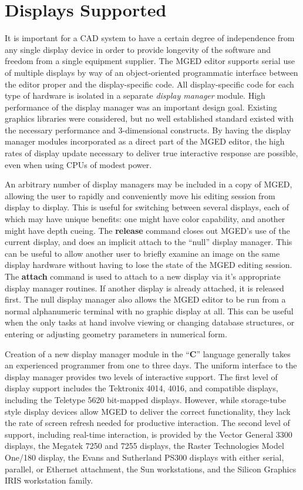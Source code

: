 \section{Displays Supported}

It is important for a CAD system to have a certain degree of independence
from any single display device in order to provide longevity of the
software and freedom from a single equipment supplier.
The MGED editor supports serial use of multiple displays by way of
an object-oriented programmatic
interface between the editor proper and the display-specific code.
All display-specific code for each type of hardware is isolated
in a separate {\em display manager} module.
High performance of the display manager was an important design goal.
Existing graphics libraries
were considered, but no well established standard existed with the necessary
performance and 3-dimensional constructs.
By having the display manager modules incorporated as a direct part of
the MGED editor, the high rates of display update necessary to deliver
true interactive response are possible, even when using CPUs of modest power.

An arbitrary number of
display managers may be included in a copy of MGED, allowing the user
to rapidly and conveniently move his editing session from display to display.
This is useful for switching between several displays, each of
which may have unique benefits:  one might have color capability,
and another might have depth cueing.
The {\bf release} command closes out MGED's use of the current
display, and does an implicit attach to the ``null'' display manager.
This can be useful to allow another user to briefly examine an image
on the same display hardware without having to lose the state of
the MGED editing session.  The {\bf attach} command is used to
attach to a new display via it's appropriate display manager routines.
If another display is already attached, it is released first.
The null display manager also allows the MGED editor to be run from a normal
alphanumeric terminal with no graphic display at all.  This can be useful
when the only tasks at hand involve viewing or changing
database structures, or entering or adjusting geometry parameters
in numerical form.

Creation of a new display manager module in the ``{\bf C}'' language
\cite{c-prog-lang}
generally takes an experienced
programmer from one to three days.
The uniform interface to the display manager provides two levels
of interactive support.
The first level of display support includes
the Tektronix 4014, 4016, and compatible displays,
including the Teletype 5620 bit-mapped displays.
However, while storage-tube style display devices allow MGED to
deliver the correct functionality, they lack the
rate of screen refresh needed for productive interaction.
The second level of support, including real-time interaction,
is provided by
the Vector General 3300 displays,
the Megatek 7250 and 7255 displays,
the Raster Technologies Model One/180 display,
the Evans and Sutherland PS300 displays
with either serial, parallel, or Ethernet attachment,
the Sun workstations,
and the Silicon Graphics IRIS workstation family.

